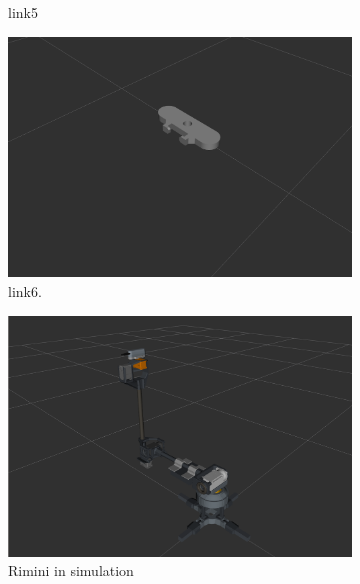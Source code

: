 \begin{figure}
\begin{subfigure}[b]{0.2\linewidth}
    \caption{link5}
  \end{subfigure}
  \begin{subfigure}[b]{0.2\linewidth}
    \includegraphics[width=\linewidth]{link6.png}
    \caption{link6.}
  \end{subfigure}
  \begin{subfigure}[c]{0.4\linewidth}
    \includegraphics[width=\linewidth]{r_mini.png}
    \caption{Rimini in simulation}
  \end{subfigure}
  \begin{subfigure}[c]{0.4\linewidth}

\end{subfigure}
\end{figure}
